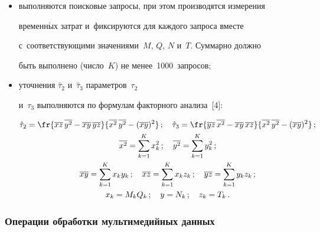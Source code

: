       \begin{itemize}


\item выполняются поисковые запросы, при этом производятся измерения 


временн$\acute{\mbox{ы}}$х затрат и~фиксируются для каждого запроса вместе 


с~соответствующими значениями~$M$, $Q$, $N$ и~$T$. Суммарно должно 


быть выполнено (число~$K$) не менее~1000~запросов;


\item уточнения $\hat{\tau}_2$ и~$\hat{\tau}_3$ параметров~$\tau_2$ 


и~$\tau_3$ выполняются по формулам факторного анализа~[4]:


\begin{gather*}


\hat{\tau}_2=\fr{\overline{xz}\, \overline{y^2}-


\overline{xy}\,\overline{yz}}{\overline{x^2}\,\overline{y^2}-


(\overline{xy})^2}\,;\quad


\hat{\tau}_3=\fr{\overline{yz}\, \overline{x^2}-


\overline{xy}\,\overline{xz}}{\overline{x^2}\,\overline{y^2}-


(\overline{xy})^2}\,;\\


\displaystyle\overline{x^2}=\sum\limits^K_{k=1} x_k^2\,;\quad 


\overline{y^2}=\sum\limits^K_{k=1} y_k^2\,;\\


\displaystyle\overline{xy}=\sum\limits_{k=1}^K x_k y_k\,;\quad 


\overline{xz}=\sum\limits^K_{k=1} x_k z_k\,;\quad 


\overline{yz}=\sum\limits^K_{k=1} y_k z_k\,;\\


x_k=M_kQ_k\,;\quad y=N_k\,;\quad z_k=T_k\,.




\end{gather*}


      \end{itemize}


      


      \subsubsection{Операции обработки мультимедийных данных}


